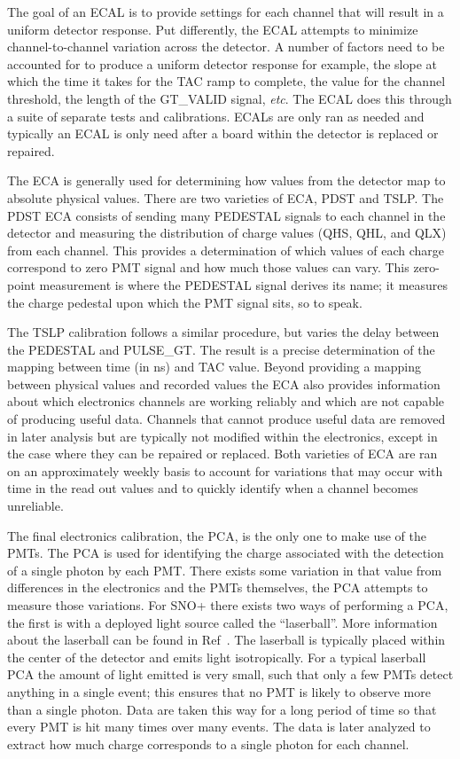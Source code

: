 The goal of an ECAL is to provide settings for each channel that will result in a uniform
detector response. Put differently, the ECAL attempts to minimize channel-to-channel variation
across the detector.
A number of factors need to be accounted for to produce a uniform detector response for example,
the slope at which the time it takes for the TAC ramp to complete, the value for the
channel threshold, the length of the GT\_VALID signal, \textit{etc}.
The ECAL does this through a suite of separate tests and calibrations.
ECALs are only ran as needed and typically an ECAL is only need after a board within the
detector is replaced or repaired.

The ECA is generally used for determining how values from the detector map to absolute
physical values.
There are two varieties of ECA,  PDST and  TSLP.
The PDST ECA consists of sending many PEDESTAL signals to each channel in the detector and
measuring the distribution of charge values (QHS, QHL, and QLX) from each channel.
This provides a determination of which values of each charge correspond to zero PMT
signal and how much those values can vary.
This zero-point measurement is where the PEDESTAL signal derives its name; it measures
the charge pedestal upon which the PMT signal sits, so to speak.

The TSLP calibration follows a similar procedure, but varies the delay between
the PEDESTAL and PULSE\_GT.
The result is a precise determination of the mapping between time (in ns) and
TAC value.
Beyond providing a mapping between physical values and recorded values the ECA
also provides information about which electronics channels are working reliably
and which are not capable of producing useful data.
Channels that cannot produce useful data are removed in later analysis but are
typically not modified within the electronics, except in the case where they
can be repaired or replaced.
Both varieties of ECA are ran on an approximately weekly basis to account for
variations that may occur with time in the read out values and to quickly
identify when a channel becomes unreliable.

The final electronics calibration, the PCA, is the only one to make use of the PMTs.
The PCA is used for identifying the charge associated with the detection of a single
photon by each PMT. There exists some variation in that value from differences in the
electronics and the PMTs themselves, the PCA attempts to measure those variations.
For SNO+ there exists two ways of performing a PCA, the first is with a deployed light
source called the ``laserball''.
More information about the laserball can be found in Ref~\cite{XXX}.
The laserball is typically placed within the center of the
detector and emits light isotropically. For a typical laserball PCA the amount of light emitted
is very small, such that only a few PMTs detect anything in a single event;
this ensures that no PMT is likely to observe more than a single photon.
Data are taken this way for a long period of time so that every PMT is hit many times over
many events. The data is later analyzed to extract how much charge corresponds to a single
photon for each channel.

